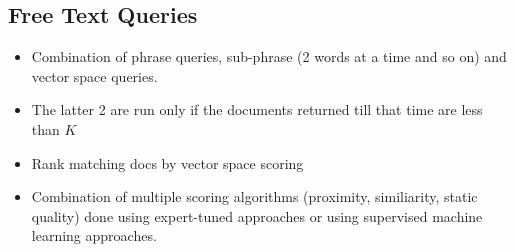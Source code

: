 \documentclass{article}
\begin{document}
\subsection{Free Text Queries}
\begin{itemize}
    \item Combination of phrase queries, sub-phrase (2 words at a time and so on) and vector space queries. 
    
    \item The latter 2 are run only if the documents returned till that time are less than $K$
    
    \item Rank matching docs by vector space scoring
    
    \item Combination of multiple scoring algorithms (proximity, similiarity, static quality) done using expert-tuned approaches or using supervised machine learning approaches. 
\end{itemize}
\end{document}
